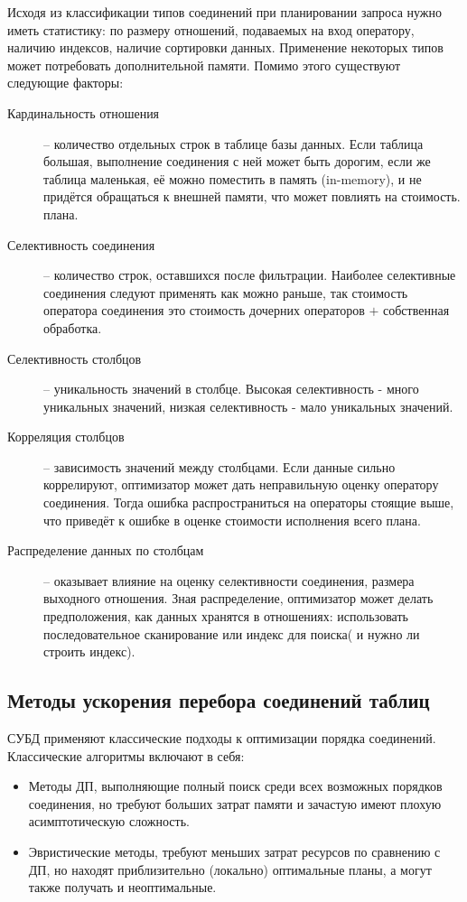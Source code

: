\documentclass[12pt]{article}
\begin{document}
\begin{flushleft}
Исходя из классификации типов соединений при планировании запроса нужно иметь 
статистику: по размеру отношений, подаваемых на вход оператору, наличию индексов, наличие сортировки данных. 
Применение некоторых типов может потребовать дополнительной памяти.
Помимо этого существуют следующие факторы:
\begin{description}
    \item[Кардинальность отношения] -- количество отдельных строк 
    в таблице базы данных. Если таблица большая, выполнение соединения с ней может 
    быть дорогим, если же таблица маленькая, её можно поместить в память (in-memory), 
    и не придётся обращаться к внешней памяти, что может повлиять на стоимость.
    плана.
    \item[Селективность соединения] -- количество строк, оставшихся после фильтрации. 
    Наиболее селективные соединения следуют применять как можно раньше, так стоимость 
    оператора соединения это стоимость дочерних операторов $+$ собственная обработка.
    \item[Селективность столбцов] -- уникальность значений в столбце. 
    Высокая селективность - много уникальных значений, низкая селективность - мало уникальных значений.
    \item[Корреляция столбцов] -- зависимость значений между столбцами. 
    Если данные сильно коррелируют, оптимизатор может дать неправильную оценку 
    оператору соединения. Тогда ошибка распространиться на операторы стоящие выше,
    что приведёт к ошибке в оценке стоимости исполнения всего плана.
    \item[Распределение данных по столбцам] -- оказывает влияние на оценку селективности
    соединения, размера выходного отношения. Зная распределение, оптимизатор может делать предположения, как
    данных хранятся в отношениях:  использовать последовательное
    сканирование или индекс для поиска( и нужно ли строить индекс).
\end{description}
\centering \subsection*{Методы ускорения перебора соединений таблиц}
\raggedright

СУБД применяют классические подходы к оптимизации 
порядка соединений.
\newline
Классические алгоритмы включают в себя:
\begin{itemize}
\item Методы ДП, выполняющие полный поиск среди всех возможных порядков
соединения, но требуют больших затрат памяти и зачастую имеют плохую
асимптотическую сложность.
\item Эвристические методы, требуют меньших затрат ресурсов по сравнению
с ДП, но находят приблизительно (локально) оптимальные планы, а могут также получать и неоптимальные.
\end{itemize}


\end{flushleft}
\end{document}

